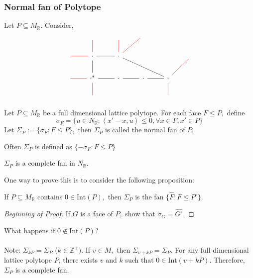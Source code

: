 \documentclass[a4paper,12pt]{amsart}
\newcommand{\R}{\ensuremath{\mathbb{R}}}
\newcommand{\Z}{\ensuremath{\mathbb{Z}}}
\newcommand{\ip}[1]{\left \langle #1 \right \rangle}
\begin{document}
\subsubsection*{Normal fan of  Polytope}
\begin{example}
	Let $P\subseteq M_\R.$ Consider,  \[ \begin{tikzcd}
	\text{}& \text{} \arrow[d,red,dash]&\text{} & \text{} &      \\
	\arrow[r,red,dash] &\cdot \arrow[r,dash] \arrow[d,dash] & \cdot \arrow[rrd, dash] \arrow[ur,red,dash]  \arrow[u,red,dash] & & &\text{}   \\
	\arrow[r,red,dash]&\cdot^* \arrow[r,dash] \arrow[d,red,dash] &	\cdot &\cdot \arrow[l,dash]   &\cdot  \arrow[l,dash] \arrow[d,red,dash]\arrow[ru,red,dash] &   \\
&\text{} & & &	\text{}
	\end{tikzcd}\]
\end{example}
\begin{definition}
	Let $P\subseteq M_\R$ be a full dimensional lattice polytope. For each face $F\leq P,$ define \[\sigma_F=\{ u\in N_\R: \ip{x'-x,u}\leq 0, \forall x\in F, x'\in P  \}   \]
	Let $\Sigma_P:= \{\sigma_F:F\leq P    \},$ then $\Sigma_P$ is called the normal fan of $P.$ 
\end{definition}
\begin{remark}
	Often $\Sigma_P$ is defined as  $\{-\sigma_F:F\leq P    \}$
\end{remark}
\begin{proposition}
	$\Sigma_P$ is a complete fan in $N_\R.$
\end{proposition}
One way to prove this is to consider the following proposition: 
\begin{proposition}
	If $P\subseteq M_\R$ contains $0\in \text{Int}(P),$ then $\Sigma_P$ is the fan $\{\hat{F}: F\leq P^\circ   \}.$
\end{proposition}
\begin{proof}[Beginning of Proof]
	If $G$ is a face of $P,$ show that $\sigma_G=\widehat{G^\circ}.$ 
\end{proof}

\noindent What happens if $0\notin \text{Int}(P)?$\\\\
Note: $\Sigma_{kP}=\Sigma_P$ ($k\in \Z^+).$ If $v\in M,$ then $\Sigma_{v+kP}=\Sigma_P.$
For any full dimensional lattice polytope $P$, there exists $v$ and $k$ such that $0\in \text{Int}(v+kP).$ Therefore, $\Sigma_P$ is a complete fan. 
\end{document}
